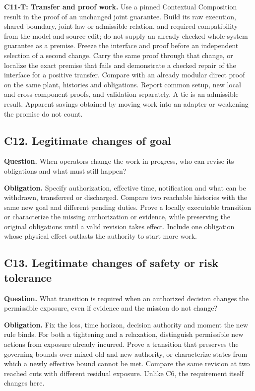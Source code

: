 \documentclass[11pt]{article}
\begin{document}
\textbf{C11-T: Transfer and proof work.} Use a pinned Contextual Composition result in the proof of an unchanged joint guarantee. Build its raw execution, shared boundary, joint law or admissible relation, and required compatibility from the model and source edit; do not supply an already checked whole-system guarantee as a premise. Freeze the interface and proof before an independent selection of a second change. Carry the same proof through that change, or localize the exact premise that fails and demonstrate a checked repair of the interface for a positive transfer. Compare with an already modular direct proof on the same plant, histories and obligations. Report common setup, new local and cross-component proofs, and validation separately. A tie is an admissible result. Apparent savings obtained by moving work into an adapter or weakening the promise do not count.

\subsection{C12. Legitimate changes of goal}
\textbf{Question.} When operators change the work in progress, who can revise its obligations and what must still happen?

\textbf{Obligation.} Specify authorization, effective time, notification and what can be withdrawn, transferred or discharged. Compare two reachable histories with the same new goal and different pending duties. Prove a locally executable transition or characterize the missing authorization or evidence, while preserving the original obligations until a valid revision takes effect. Include one obligation whose physical effect outlasts the authority to start more work.

\subsection{C13. Legitimate changes of safety or risk tolerance}
\textbf{Question.} What transition is required when an authorized decision changes the permissible exposure, even if evidence and the mission do not change?

\textbf{Obligation.} Fix the loss, time horizon, decision authority and moment the new rule binds. For both a tightening and a relaxation, distinguish permissible new actions from exposure already incurred. Prove a transition that preserves the governing bounds over mixed old and new authority, or characterize states from which a newly effective bound cannot be met. Compare the same revision at two reached cuts with different residual exposure. Unlike C6, the requirement itself changes here.
\end{document}
